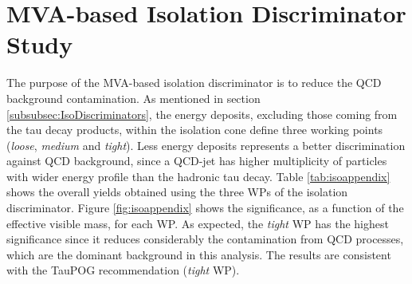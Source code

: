 \section{MVA-based Isolation Discriminator Study}
\label{Results:TauID-isoDicr}

\noindent The purpose of the MVA-based isolation discriminator is to reduce the QCD background
contamination. As mentioned in section \ref{subsubsec:IsoDiscriminators}, the energy 
deposits, excluding those coming from the tau decay products, within the isolation cone
define three working points (\textit{loose}, \textit{medium} and \textit{tight}). Less 
energy deposits represents a better discrimination against QCD background, since 
a QCD-jet has higher multiplicity of particles with wider energy profile than
the hadronic tau decay. Table \ref{tab:isoappendix} shows the overall yields obtained using 
the three WPs of the isolation discriminator. Figure \ref{fig:isoappendix} shows 
the significance, as a function of the effective visible mass, for each WP. As expected,
the \textit{tight} WP has the highest significance since it reduces considerably the 
contamination from QCD processes, which are the dominant background in this 
analysis. The results are consistent with the TauPOG recommendation (\textit{tight} WP).




